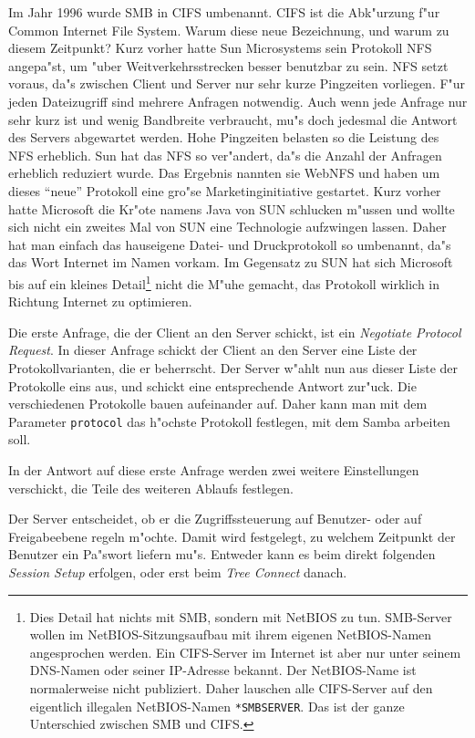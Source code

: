 \documentclass{scrartcl}\usepackage{pslatex}\typearea{12}
\newcommand{\param}{\texttt}
\newcommand{\nbname}{\texttt}
\newcommand{\defin}{\emph}
\begin{document}
Im Jahr 1996 wurde SMB in CIFS umbenannt. CIFS ist die Abk"urzung f"ur
Common Internet File System. Warum diese neue Bezeichnung, und warum
zu diesem Zeitpunkt? Kurz vorher hatte Sun Microsystems sein Protokoll
NFS angepa"st, um "uber Weitverkehrsstrecken besser benutzbar zu sein.
NFS setzt voraus, da"s zwischen Client und Server nur sehr kurze
Pingzeiten vorliegen. F"ur jeden Dateizugriff sind mehrere Anfragen
notwendig. Auch wenn jede Anfrage nur sehr kurz ist und wenig
Bandbreite verbraucht, mu"s doch jedesmal die Antwort des Servers
abgewartet werden. Hohe Pingzeiten belasten so die Leistung des NFS
erheblich. Sun hat das NFS so ver"andert, da"s die Anzahl der Anfragen
erheblich reduziert wurde. Das Ergebnis nannten sie WebNFS und haben
um dieses "`neue"' Protokoll eine gro"se Marketinginitiative
gestartet. Kurz vorher hatte Microsoft die Kr"ote namens Java von SUN
schlucken m"ussen und wollte sich nicht ein zweites Mal von SUN eine
Technologie aufzwingen lassen. Daher hat man einfach das hauseigene
Datei- und Druckprotokoll so umbenannt, da"s das Wort Internet im
Namen vorkam. Im Gegensatz zu SUN hat sich Microsoft bis auf ein
kleines Detail\footnote{Dies Detail hat nichts mit SMB, sondern mit
  NetBIOS zu tun. SMB-Server wollen im NetBIOS-Sitzungsaufbau mit
  ihrem eigenen NetBIOS-Namen angesprochen werden. Ein CIFS-Server im
  Internet ist aber nur unter seinem DNS-Namen oder seiner IP-Adresse
  bekannt. Der NetBIOS-Name ist normalerweise nicht publiziert. Daher
  lauschen alle CIFS-Server auf den eigentlich illegalen NetBIOS-Namen
  \nbname{*SMBSERVER}. Das ist der ganze Unterschied zwischen SMB und
  CIFS.} nicht die M"uhe gemacht, das Protokoll wirklich in Richtung
Internet zu optimieren.

Die erste Anfrage, die der Client an den Server schickt, ist ein
\defin{Negotiate Protocol Request}. In dieser Anfrage schickt der
Client an den Server eine Liste der Protokollvarianten, die er
beherrscht. Der Server w"ahlt nun aus dieser Liste der Protokolle eins
aus, und schickt eine entsprechende Antwort zur"uck. Die verschiedenen
Protokolle bauen aufeinander auf. Daher kann man mit dem Parameter
\param{protocol} das h"ochste Protokoll festlegen, mit dem Samba
arbeiten soll.

In der Antwort auf diese erste Anfrage werden zwei weitere
Einstellungen verschickt, die Teile des weiteren Ablaufs festlegen.

Der Server entscheidet, ob er die Zugriffssteuerung auf Benutzer- oder
auf Freigabeebene regeln m"ochte. Damit wird festgelegt, zu welchem
Zeitpunkt der Benutzer ein Pa"swort liefern mu"s. Entweder kann es
beim direkt folgenden \defin{Session Setup} erfolgen, oder erst beim
\defin{Tree Connect} danach.
\end{document}
